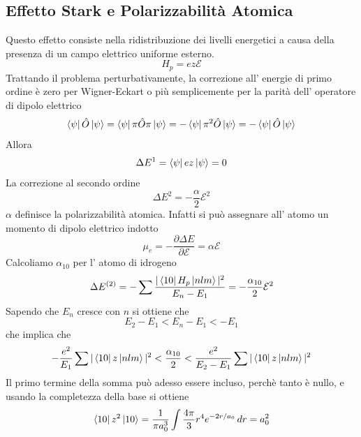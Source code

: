 \documentclass[11pt,a4paper]{article}
\theoremstyle{springer}
\theoremstyle{definition}
\theoremstyle{remark}
\begin{document}
\subsection{Effetto Stark e Polarizzabilità Atomica}
Questo effetto consiste nella ridistribuzione dei livelli energetici a causa della presenza di un campo elettrico uniforme esterno.
\begin{equation*}
  H_p = e z \mathcal{E}
\end{equation*}
Trattando il problema perturbativamente, la correzione all' energie di primo ordine è zero per Wigner-Eckart o più semplicemente per la parità dell' operatore di dipolo elettrico 
\begin{equation*}
  \bra{\psi} \hat{O} \ket{\psi} = \bra{\psi} \pi \hat{O} \pi \ket{\psi} = - \bra{\psi} \pi^2 \hat{O} \ket{\psi} = -\bra{\psi} \hat{O} \ket{\psi}
\end{equation*}
Allora 
\begin{equation*}
  \Delta E^1 = \bra{\psi} e z \ket{\psi} = 0
\end{equation*}
La correzione al secondo ordine 
\begin{equation*}
  \Delta E^2 = -\frac{\alpha}{2}\mathcal{E}^2
\end{equation*}
$\alpha$ definisce la polarizzabilità atomica. Infatti si può assegnare all' atomo un momento di dipolo elettrico indotto 
\begin{equation*}
  \mu_e = -\frac{\partial\Delta E}{\partial \mathcal{E}} = \alpha \mathcal{E}
\end{equation*}
Calcoliamo $\alpha_{10}$ per l' atomo di idrogeno 
\begin{equation*}
  \Delta E^{(2)} = -\sum \frac{|\bra{10} H_p \ket{nlm}|^2 }{E_n-E_1} = -\frac{\alpha_{10}}{2}\mathcal{E}^2
\end{equation*}
Sapendo che $E_n$ cresce con $n$ si ottiene che 
\begin{equation*}
  E_2-E_1 < E_n - E_1 < -E_1
\end{equation*}
che implica che 
\begin{equation*}
-\frac{e^2}{E_1} \sum |\bra{10}z \ket{nlm}|^2 < \frac{\alpha_{10}}{2} < \frac{e^2}{E_2-E_1} \sum |\bra{10}z\ket{nlm}|^2
\end{equation*}
Il primo termine della somma può adesso essere incluso, perchè tanto è nullo, e usando la completezza della base si ottiene
\begin{equation*}
  \bra{10}z^2 \ket{10} = \frac{1}{\pi a_0^3} \int \frac{4\pi}{3}r^4 e^{-2r/a_0} \,dr = a_0^2
\end{equation*}
\end{document}
